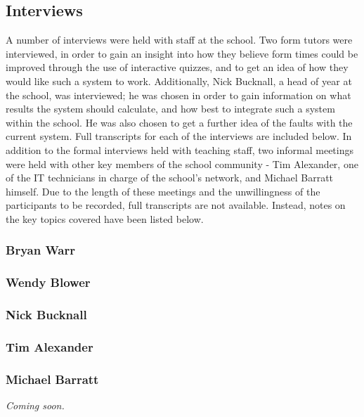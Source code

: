 \subsection{Interviews}

A number of interviews were held with staff at the school. Two form tutors were interviewed, in order to gain an insight into how they believe form times could be improved through the use of interactive quizzes, and to get an idea of how they would like such a system to work. Additionally, Nick Bucknall, a head of year at the school, was interviewed; he was chosen in order to gain information on what results the system should calculate, and how best to integrate such a system within the school. He was also chosen to get a further idea of the faults with the current system. Full transcripts for each of the interviews are included below. In addition to the formal interviews held with teaching staff, two informal meetings were held with other key members of the school community - Tim Alexander, one of the IT technicians in charge of the school's network, and Michael Barratt himself. Due to the length of these meetings and the unwillingness of the participants to be recorded, full transcripts are not available. Instead, notes on the key topics covered have been listed below.

\subsubsection{Bryan Warr}


\subsubsection{Wendy Blower}



\subsubsection{Nick Bucknall}



\subsubsection{Tim Alexander}



\subsubsection{Michael Barratt}

\textit{Coming soon.}
